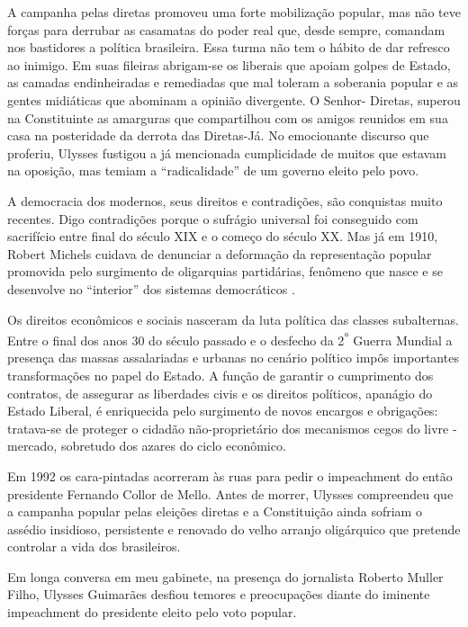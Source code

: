 A campanha pelas diretas promoveu uma forte mobilização popular, mas não
teve forças para derrubar as casamatas do poder real que, desde sempre,
comandam nos bastidores a política brasileira. Essa turma não tem o
hábito de dar refresco ao inimigo. Em suas fileiras abrigam-se os
liberais que apoiam golpes de Estado, as camadas endinheiradas e
remediadas que mal toleram a soberania popular e as gentes midiáticas
que abominam a opinião divergente. O Senhor- Diretas, superou na
Constituinte as amarguras que compartilhou com os amigos reunidos em sua
casa na posteridade da derrota das Diretas-Já. No emocionante discurso
que proferiu, Ulysses fustigou a já mencionada cumplicidade de muitos
que estavam na oposição, mas temiam a ``radicalidade'' de um governo
eleito pelo povo.

A democracia dos modernos, seus direitos e contradições, são conquistas
muito recentes. Digo contradições porque o sufrágio universal foi
conseguido com sacrifício entre final do século XIX e o começo do século
XX. Mas já em 1910, Robert Michels cuidava de denunciar a deformação da
representação popular promovida pelo surgimento de oligarquias
partidárias, fenômeno que nasce e se desenvolve no ``interior'' dos
sistemas democráticos .

Os direitos econômicos e sociais nasceram da luta política das classes
subalternas. Entre o final dos anos 30 do século passado e o desfecho da
2\textsuperscript{ª} Guerra Mundial a presença das massas assalariadas e
urbanas no cenário político impôs importantes transformações no papel do
Estado. A função de garantir o cumprimento dos contratos, de assegurar
as liberdades civis e os direitos políticos, apanágio do Estado Liberal,
é enriquecida pelo surgimento de novos encargos e obrigações: tratava-se
de proteger o cidadão não-proprietário dos mecanismos cegos do livre -
mercado, sobretudo dos azares do ciclo econômico.

Em 1992 os cara-pintadas acorreram às ruas para pedir o impeachment do
então presidente Fernando Collor de Mello. Antes de morrer, Ulysses
compreendeu que a campanha popular pelas eleições diretas e a
Constituição ainda sofriam o assédio insidioso, persistente e renovado
do velho arranjo oligárquico que pretende controlar a vida dos
brasileiros.

Em longa conversa em meu gabinete, na presença do jornalista Roberto
Muller Filho, Ulysses Guimarães desfiou temores e preocupações diante do
iminente impeachment do presidente eleito pelo voto popular.

